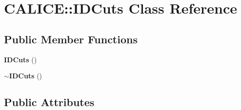 \section{C\-A\-L\-I\-C\-E\-:\-:I\-D\-Cuts Class Reference}
\label{classCALICE_1_1IDCuts}
\subsection*{Public Member Functions}
\begin{DoxyCompactItemize}
\item 
{\bf I\-D\-Cuts} ()
\item 
{\bf $\sim$\-I\-D\-Cuts} ()
\end{DoxyCompactItemize}
\subsection*{Public Attributes}
